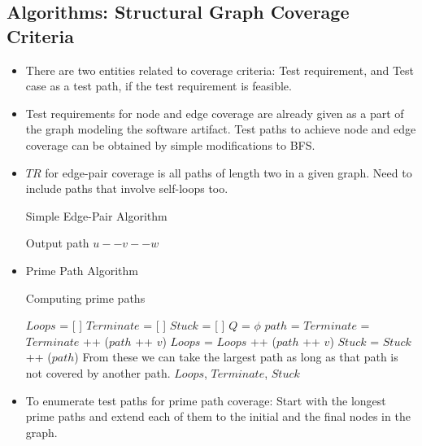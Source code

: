 \documentclass[a4paper]{article}
\begin{document}
\subsection{Algorithms: Structural Graph Coverage Criteria}
\begin{itemize}
    \item There are two entities related to coverage criteria: Test requirement, and Test case as a test path, if the test requirement is feasible.
    \item Test requirements for node and edge coverage are already given as a part of the graph modeling the software artifact. Test paths to achieve node and edge coverage can be obtained by simple modifications to BFS.
    \item $TR$ for edge-pair coverage is all paths of length two in a given graph. Need to include paths that involve self-loops too.
    \begin{algorithm}[H]
        \caption{Simple Edge-Pair Algorithm}
        \begin{algorithmic}[1]
                        \State Output path $u--v--w$
                    \EndFor
                \EndFor
            \EndFor
        \end{algorithmic}
    \end{algorithm}
    \item Prime Path Algorithm
    \begin{algorithm}[H]
        \caption{Computing prime paths}
        \begin{algorithmic}[1]
            \State $Loops$ = [ ]
            \State $Terminate$ = [ ]
            \State $Stuck$ = [ ]
            \State $Q$ = $\phi$
                \State {}
            \EndFor
                \State $path$ = 
                        \State $Terminate$ = $Terminate$ ++ ($path$ ++ $v$)
                        \State $Loops$ = $Loops$ ++ ($path$ ++ $v$)
                        \State $Stuck$ = $Stuck$ ++ ($path$)
                    \Else
                        \State {}
                    \EndIf
                \EndFor
            \EndWhile
            \LComment From these we can take the largest path as long as that path is not covered by another path.
            \State \Return $Loops$, $Terminate$, $Stuck$
        \end{algorithmic}
    \end{algorithm}
    \item To enumerate test paths for prime path coverage: Start with the longest prime paths and extend each of them to the initial and the final nodes in the graph.
\end{itemize}
\end{document}
